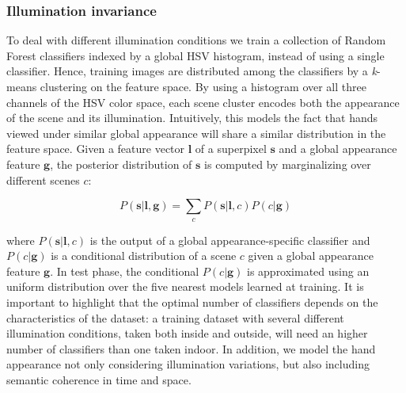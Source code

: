 \subsubsection{Illumination invariance}
To deal with different illumination conditions we train a collection of Random Forest classifiers indexed by a global HSV histogram, instead of using a single classifier. Hence, training images are distributed among the classifiers by a \textsl{k}-means clustering on the feature space. By using a histogram over all three channels of the HSV color space, each scene cluster encodes both the appearance of the scene and its illumination. Intuitively, this models the fact that hands viewed under similar global appearance will share a similar distribution in the feature space. Given a feature vector $\mathbf{l}$ of a superpixel $\mathbf{s}$ and a global appearance
feature $\mathbf{g}$, the posterior distribution of $\mathbf{s}$
is computed by marginalizing over different scenes $c$:

\begin{equation}
P(\mathbf{s}|\mathbf{l},\mathbf{g})=\sum_{c}P(\mathbf{s}|\mathbf{l},c)P(c|\mathbf{g})
\end{equation}


where $P(\mathbf{s}|\mathbf{l},c)$ is the output of a global appearance-specific
classifier and $P(c|\mathbf{g})$ is a conditional distribution of a
scene $c$ given a global appearance feature $\mathbf{g}$. In test
phase, the conditional $P(c|\mathbf{g})$ is approximated using an
uniform distribution over the five nearest models learned at training.
It is important to highlight that the optimal number of classifiers
depends on the characteristics of the dataset: a training dataset
with several different illumination conditions, taken both inside and
outside, will need an higher number of classifiers than one taken indoor.
In addition, we model the hand appearance not
only considering illumination variations, but also including semantic coherence in time and space.


